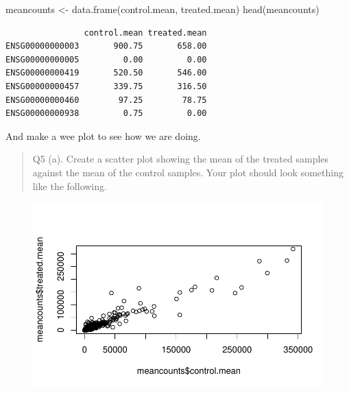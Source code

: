 \documentclass[
  letterpaper,
  DIV=11,
  numbers=noendperiod]{scrartcl}
\newenvironment{Shaded}{\begin{snugshade}}{\end{snugshade}}
\newcommand{\FunctionTok}[1]{\textcolor[rgb]{0.28,0.35,0.67}{#1}}
\newcommand{\NormalTok}[1]{\textcolor[rgb]{0.00,0.23,0.31}{#1}}
\newcommand{\OtherTok}[1]{\textcolor[rgb]{0.00,0.23,0.31}{#1}}
\newcommand{\SpecialCharTok}[1]{\textcolor[rgb]{0.37,0.37,0.37}{#1}}
\begin{document}
\begin{Shaded}
\begin{Highlighting}[]
\NormalTok{meancounts }\OtherTok{\textless{}{-}} \FunctionTok{data.frame}\NormalTok{(control.mean, treated.mean)}
\FunctionTok{head}\NormalTok{(meancounts)}
\end{Highlighting}
\end{Shaded}

\begin{verbatim}
                control.mean treated.mean
ENSG00000000003       900.75       658.00
ENSG00000000005         0.00         0.00
ENSG00000000419       520.50       546.00
ENSG00000000457       339.75       316.50
ENSG00000000460        97.25        78.75
ENSG00000000938         0.75         0.00
\end{verbatim}

And make a wee plot to see how we are doing.

\begin{quote}
Q5 (a). Create a scatter plot showing the mean of the treated samples
against the mean of the control samples. Your plot should look something
like the following.
\end{quote}

\begin{Shaded}
\end{Shaded}

\begin{figure}[H]

{\centering \includegraphics{class12_files/figure-pdf/unnamed-chunk-16-1.pdf}

}

\end{figure}
\end{document}
